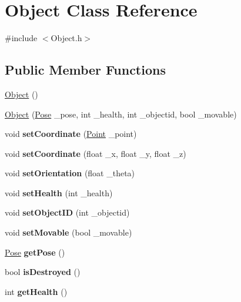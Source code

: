 \hypertarget{class_object}{
\section{Object Class Reference}
\label{class_object}
}


{\ttfamily \#include $<$Object.h$>$}

\subsection*{Public Member Functions}
\begin{DoxyCompactItemize}
\item 
\hyperlink{class_object_a40860402e64d8008fb42329df7097cdb}{Object} ()
\item 
\hyperlink{class_object_a4fa29a635815662790df5caf339f2283}{Object} (\hyperlink{class_pose}{Pose} \_\-pose, int \_\-health, int \_\-objectid, bool \_\-movable)
\item 
\hypertarget{class_object_a9916c124808dd5327ee9db651999ee5e}{
void {\bfseries setCoordinate} (\hyperlink{class_point}{Point} \_\-point)}
\label{class_object_a9916c124808dd5327ee9db651999ee5e}

\item 
\hypertarget{class_object_aec5919a308227be70d7a830352dad309}{
void {\bfseries setCoordinate} (float \_\-x, float \_\-y, float \_\-z)}
\label{class_object_aec5919a308227be70d7a830352dad309}

\item 
\hypertarget{class_object_a2d8021509bbfad53a64500945e96ab77}{
void {\bfseries setOrientation} (float \_\-theta)}
\label{class_object_a2d8021509bbfad53a64500945e96ab77}

\item 
\hypertarget{class_object_a2c0c764d747737cdddc921c7f7434e0c}{
void {\bfseries setHealth} (int \_\-health)}
\label{class_object_a2c0c764d747737cdddc921c7f7434e0c}

\item 
\hypertarget{class_object_abd55d1176506de26480c149cea2e4e80}{
void {\bfseries setObjectID} (int \_\-objectid)}
\label{class_object_abd55d1176506de26480c149cea2e4e80}

\item 
\hypertarget{class_object_a731feebfbf40bc85e3ebaa6fdec42cf5}{
void {\bfseries setMovable} (bool \_\-movable)}
\label{class_object_a731feebfbf40bc85e3ebaa6fdec42cf5}

\item 
\hypertarget{class_object_a686a8f78bf82a31ebfd1fbbc3a949c1f}{
\hyperlink{class_pose}{Pose} {\bfseries getPose} ()}
\label{class_object_a686a8f78bf82a31ebfd1fbbc3a949c1f}

\item 
\hypertarget{class_object_a5d93664b6f77c6581757f201e59f9e3c}{
bool {\bfseries isDestroyed} ()}
\label{class_object_a5d93664b6f77c6581757f201e59f9e3c}

\item 
\hypertarget{class_object_a4be5c0a55f1bb5becf04dc42227bfa8f}{
int {\bfseries getHealth} ()}
\label{class_object_a4be5c0a55f1bb5becf04dc42227bfa8f}

\end{DoxyCompactItemize}


